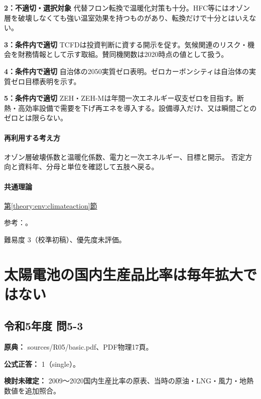 \noindent\textbf{2：不適切・選択対象} 代替フロン転換で温暖化対策も十分。HFC等にはオゾン層を破壊しなくても強い温室効果を持つものがあり、転換だけで十分とはいえない。\par

\noindent\textbf{3：条件内で適切} TCFDは投資判断に資する開示を促す。気候関連のリスク・機会を財務情報として示す取組。賛同機関数は2020時点の値として扱う。\par

\noindent\textbf{4：条件内で適切} 自治体の2050実質ゼロ表明。ゼロカーボンシティは自治体の実質ゼロ目標表明を示す。\par

\noindent\textbf{5：条件内で適切} ZEH・ZEH-Mは年間一次エネルギー収支ゼロを目指す。断熱・高効率設備で需要を下げ再エネを導入する。設備導入だけ、又は瞬間ごとのゼロとは限らない。\par

\paragraph{再利用する考え方} オゾン層破壊係数と温暖化係数、電力と一次エネルギー、目標と開示。 否定方向と資料年、分母と単位を確認して五肢へ戻る。

\paragraph{共通理論} \hyperref[theory:env:climateaction]{第\ref*{theory:env:climateaction}節}

\par 参考：\cite{env60_blue}。

\par 難易度 3（校準初稿）、優先度未評価。

\section{太陽電池の国内生産品比率は毎年拡大ではない}

\subsection{令和5年度 問5-3}
\label{q:r05-reg-basic-5-3}

\noindent\textbf{原典：} sources/R05/basic.pdf、PDF物理17頁。

\textbf{公式正答：} 1（single）。

\par\textbf{検討未確定：} 2009〜2020国内生産比率の原表、当時の原油・LNG・風力・地熱数値を追加照合。

